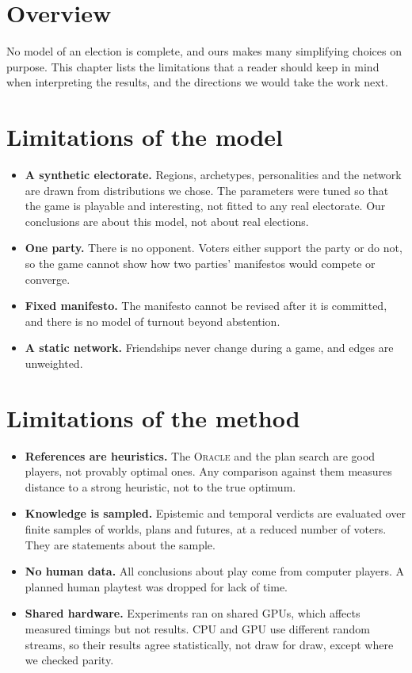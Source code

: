 \documentclass[11pt,a4paper,oneside]{report}
\newcommand{\ORACLE}{\textsc{Oracle}}
\newcommand{\overviewsection}{\section{Overview}}
\begin{document}
\overviewsection

No model of an election is complete, and ours makes many simplifying choices on purpose. This chapter lists
the limitations that a reader should keep in mind when interpreting the results, and the directions we
would take the work next.

\section{Limitations of the model}

\begin{itemize}
  \item \textbf{A synthetic electorate.} Regions, archetypes, personalities and the network are drawn from
        distributions we chose. The parameters were tuned so that the game is playable and interesting,
        not fitted to any real electorate. Our conclusions are about this model, not about real elections.
  \item \textbf{One party.} There is no opponent. Voters either support the party or do not, so the game
        cannot show how two parties' manifestos would compete or converge.
  \item \textbf{Fixed manifesto.} The manifesto cannot be revised after it is committed, and there is no
        model of turnout beyond abstention.
  \item \textbf{A static network.} Friendships never change during a game, and edges are unweighted.
\end{itemize}

\section{Limitations of the method}

\begin{itemize}
  \item \textbf{References are heuristics.} The \ORACLE{} and the plan search are good players, not
        provably optimal ones. Any comparison against them measures distance to a strong heuristic, not to
        the true optimum.
  \item \textbf{Knowledge is sampled.} Epistemic and temporal verdicts are evaluated over finite samples
        of worlds, plans and futures, at a reduced number of voters. They are statements about the sample.
  \item \textbf{No human data.} All conclusions about play come from computer players. A planned human
        playtest was dropped for lack of time.
  \item \textbf{Shared hardware.} Experiments ran on shared GPUs, which affects measured timings but not
        results. CPU and GPU use different random streams, so their results agree statistically, not draw
        for draw, except where we checked parity.
\end{itemize}
\end{document}
